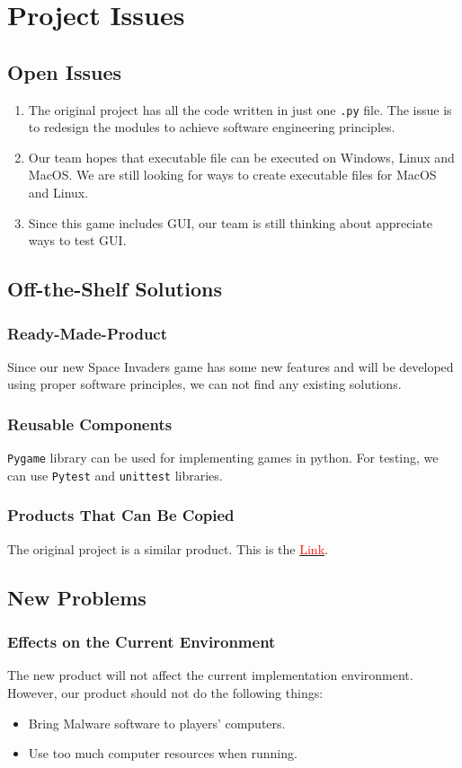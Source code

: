 \documentclass[12pt]{article}
\begin{document}
\section{Project Issues}
\subsection{Open Issues}
\begin{enumerate}[{Issue}1.]
\item The original project has all the code written in just 
one \verb|.py| file. The issue is to redesign the modules to
achieve software engineering principles.
\item Our team hopes that executable file can be executed on
Windows, Linux and MacOS. We are still looking for ways to 
create executable files for MacOS and Linux.
\item Since this game includes GUI, our team is still thinking
about appreciate ways to test GUI.
\end{enumerate}
\subsection{Off-the-Shelf Solutions}
\subsubsection{Ready-Made-Product}
Since our new Space Invaders game has some new features
and  will
be developed using proper software principles, we can not
find any existing solutions.
\subsubsection{Reusable Components}
\verb|Pygame| library can be used for implementing games in python.
For testing, we can use \verb|Pytest| and \verb|unittest|
libraries.
\subsubsection{Products That Can Be Copied}
The original project is a similar product. This is the \href{https://github.com/leerob/space-invaders}{\textcolor{red}{Link}}.\\
\subsection{New Problems}
\subsubsection{Effects on the Current Environment}
The new product will not affect the current implementation
environment. However, our product should not do the following 
things:
\begin{itemize}
\item Bring Malware software to players' computers.
\item Use too much computer resources when running.
\end{itemize}
\end{document}
